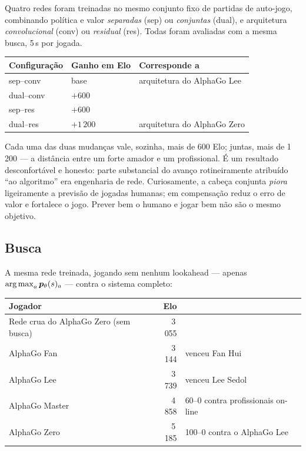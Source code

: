 \documentclass[11pt]{article}
\newcommand{\redepol}{\bm{p}_{\theta}}
\begin{document}
Quatro redes foram treinadas no mesmo conjunto fixo de partidas de auto-jogo,
combinando política e valor \emph{separadas} (sep) ou \emph{conjuntas} (dual), e
arquitetura \emph{convolucional} (conv) ou \emph{residual} (res). Todas foram
avaliadas com a mesma busca, 5\,s por jogada.

\begin{center}
\begin{tabular}{lll}
\toprule
Configuração & Ganho em Elo & Corresponde a \\
\midrule
sep--conv  & base       & arquitetura do AlphaGo Lee \\
dual--conv & $+600$     & \\
sep--res   & $+600$     & \\
dual--res  & $+1\,200$  & arquitetura do AlphaGo Zero \\
\bottomrule
\end{tabular}
\end{center}

Cada uma das duas mudanças vale, sozinha, mais de 600 Elo; juntas, mais de 1\,200 —
a distância entre um forte amador e um profissional. É um resultado desconfortável
e honesto: parte substancial do avanço rotineiramente atribuído ``ao algoritmo''
era engenharia de rede. Curiosamente, a cabeça conjunta \emph{piora} ligeiramente
a previsão de jogadas humanas; em compensação reduz o erro de valor e fortalece o
jogo. Prever bem o humano e jogar bem não são o mesmo objetivo.

\subsection{Busca}

A mesma rede treinada, jogando sem nenhum lookahead — apenas
$\argmax_a \redepol(s)_a$ — contra o sistema completo:

\begin{center}
\begin{tabular}{lrl}
\toprule
Jogador & Elo & \\
\midrule
Rede crua do AlphaGo Zero (sem busca) & 3\,055 & \\
AlphaGo Fan   & 3\,144 & venceu Fan Hui \\
AlphaGo Lee   & 3\,739 & venceu Lee Sedol \\
AlphaGo Master & 4\,858 & 60--0 contra profissionais on-line \\
AlphaGo Zero  & 5\,185 & 100--0 contra o AlphaGo Lee \\
\bottomrule
\end{tabular}
\end{center}
\end{document}
